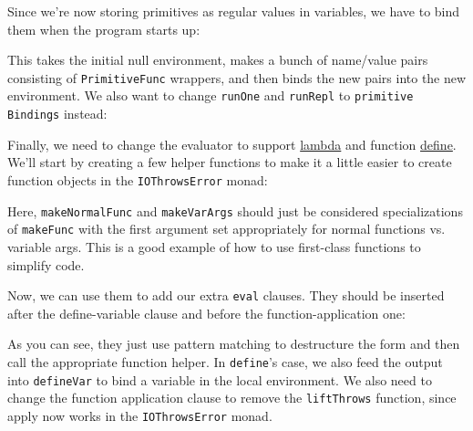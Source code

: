 Since we're now storing primitives as regular values in variables, we have to bind them when the program starts up:
 
 
\sloppy
This takes the initial null environment, makes a bunch of name/value pairs consisting of \verb|PrimitiveFunc| wrappers, and then binds the new pairs into the new environment. We also want to change \verb|runOne| and \verb|runRepl| to \verb|primitive| \verb|Bindings| instead:
\fussy
 
 
Finally, we need to change the evaluator to support \href{http://www.schemers.org/Documents/Standards/R5RS/HTML/r5rs-Z-H-7.html\#\%_sec_4.1.4}{lambda} and function \href{http://www.schemers.org/Documents/Standards/R5RS/HTML/r5rs-Z-H-8.html\#\%_sec_5.2}{define}. We'll start by creating a few helper functions to make it a little easier to create function objects in the \verb|IOThrowsError| monad:
 
 
Here, \verb|makeNormalFunc| and \verb|makeVarArgs| should just be considered specializations of \verb|makeFunc| with the first argument set appropriately for normal functions vs. variable args. This is a good example of how to use first-class functions to simplify code.
 
Now, we can use them to add our extra \verb|eval| clauses. They should be inserted after the define-variable clause and before the function-application one:
 
 
As you can see, they just use pattern matching to destructure the form and then call the appropriate function helper. In \verb|define|'s case, we also feed the output into \verb|defineVar| to bind a variable in the local environment. We also need to change the function application clause to remove the \verb|liftThrows| function, since apply now works in the \verb|IOThrowsError| monad.
 
